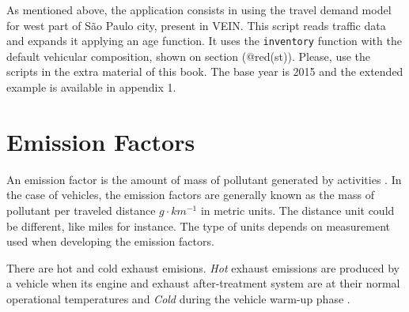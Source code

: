 \documentclass[12pt,graybox,envcountchap,sectrefs]{krantz}
\makeatletter
\newenvironment{Shaded}{\begin{snugshade}}{\end{snugshade}}
\newcommand{\KeywordTok}[1]{\textcolor[rgb]{0.13,0.29,0.53}{\textbf{#1}}}
\newcommand{\DataTypeTok}[1]{\textcolor[rgb]{0.13,0.29,0.53}{#1}}
\newcommand{\StringTok}[1]{\textcolor[rgb]{0.31,0.60,0.02}{#1}}
\newcommand{\CommentTok}[1]{\textcolor[rgb]{0.56,0.35,0.01}{\textit{#1}}}
\newcommand{\OperatorTok}[1]{\textcolor[rgb]{0.81,0.36,0.00}{\textbf{#1}}}
\newcommand{\NormalTok}[1]{#1}
\newenvironment{kframe}{%
\medskip{}
\setlength{\fboxsep}{.8em}
 \def\at@end@of@kframe{}%
 \ifinner\ifhmode%
  \def\at@end@of@kframe{\end{minipage}}%
  \begin{minipage}{\columnwidth}%
 \fi\fi%
 \def\FrameCommand##1{\hskip\@totalleftmargin \hskip-\fboxsep
 \colorbox{shadecolor}{##1}\hskip-\fboxsep
     \hskip-\linewidth \hskip-\@totalleftmargin \hskip\columnwidth}%
 \MakeFramed {\advance\hsize-\width
   \@totalleftmargin\z@ \linewidth\hsize
   \@setminipage}}%
 {\par\unskip\endMakeFramed%
 \at@end@of@kframe}
\renewenvironment{Shaded}{\begin{kframe}}{\end{kframe}}
\theoremstyle{definition}
\theoremstyle{definition}
\theoremstyle{definition}
\theoremstyle{remark}
\makeatother
\begin{document}
As mentioned above, the application consists in using the travel demand
model for west part of São Paulo city, present in VEIN. This script
reads traffic data and expands it applying an age function. It uses the
\texttt{inventory} function with the default vehicular composition,
shown on section (@red(st)). Please, use the scripts in the extra
material of this book. The base year is 2015 and the extended example is
available in appendix 1.

\begin{Shaded}
\end{Shaded}

\chapter{Emission Factors}\label{ef}

An emission factor is the amount of mass of pollutant generated by
activities \citep{pulles2010art}. In the case of vehicles, the emission
factors are generally known as the mass of pollutant per traveled
distance \(g \cdot km^{-1}\) in metric units. The distance unit could be
different, like miles for instance. The type of units depends on
measurement used when developing the emission factors.

There are hot and cold exhaust emisions. \emph{Hot} exhaust emissions
are produced by a vehicle when its engine and exhaust after-treatment
system are at their normal operational temperatures and \emph{Cold}
during the vehicle warm-up phase \citep{trlef}.
\end{document}
